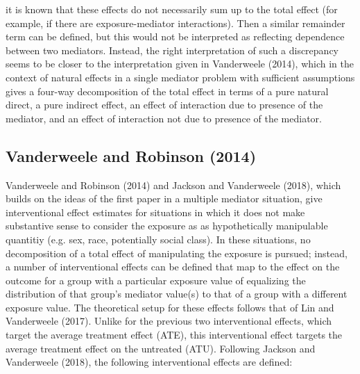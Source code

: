 \documentclass[12pt]{article} %
\numberwithin{equation}{section} %
\begin{document}
\begin{itemize}
it is known that these effects do not necessarily sum up to the total effect (for example, if there are exposure-mediator interactions). 
Then a similar remainder term can be defined, but this would not be interpreted as reflecting dependence between two mediators. Instead,
the right interpretation of such a discrepancy seems to be closer to the interpretation given in Vanderweele (2014), which in the 
context of natural effects in a single mediator problem with sufficient assumptions gives a four-way decomposition of the total effect
in terms of a pure natural direct, a pure indirect effect, an effect of interaction due to presence of the mediator, and an effect of 
interaction not due to presence of the mediator. 
\end{itemize}

\subsection{Vanderweele and Robinson (2014)}

Vanderweele and Robinson (2014) and Jackson and Vanderweele (2018), which builds on the ideas of the first paper in a multiple mediator
situation, give interventional effect estimates for situations in which it does not make substantive sense to consider the exposure as
as hypothetically manipulable quantitiy (e.g. sex, race, potentially social class). In these situations, no decomposition of a total effect
of manipulating the exposure is pursued; instead, a number of interventional effects can be defined that map to the effect on the outcome
for a group with a particular exposure value of equalizing the distribution of that group's mediator value(s) to that of a group with
a different exposure value. The theoretical setup for these effects follows that of Lin and Vanderweele (2017). Unlike for 
the previous two interventional effects, which target the average treatment effect (ATE), this interventional effect targets
the average treatment effect on the untreated (ATU). 
Following Jackson and Vanderweele (2018), the following interventional effects are defined: 
\end{document}
